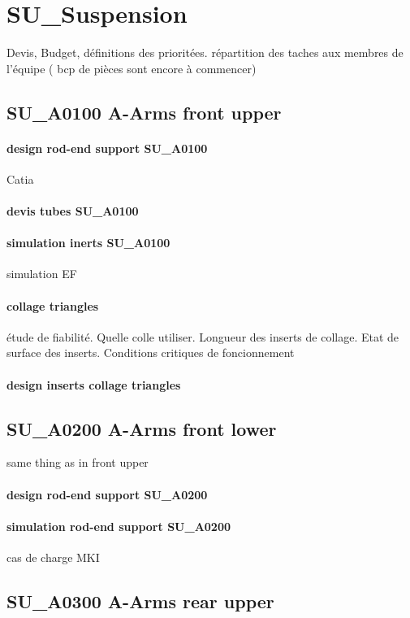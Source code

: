 \newpage 
 \section*{SU\_Suspension} 
 \par Devis, Budget, définitions des prioritées. répartition des taches aux membres de l'équipe ( bcp de pièces sont encore à commencer)
	\subsection*{SU\_A0100 A-Arms front upper} 
 \par 
		\paragraph{design rod-end support SU\_A0100} Catia

		\paragraph{devis tubes SU\_A0100} 
		\paragraph{simulation inerts SU\_A0100} simulation EF
		\paragraph{collage triangles} étude de fiabilité. Quelle colle utiliser. Longueur des inserts de collage. Etat de surface des inserts. Conditions critiques de foncionnement
		\paragraph{design inserts collage triangles} 
	\subsection*{SU\_A0200 A-Arms front lower} 
 \par same thing as in front upper
		\paragraph{design rod-end support SU\_A0200} 
		\paragraph{simulation rod-end support SU\_A0200} cas de charge MKI
	\subsection*{SU\_A0300 A-Arms rear upper} 
 \par 
